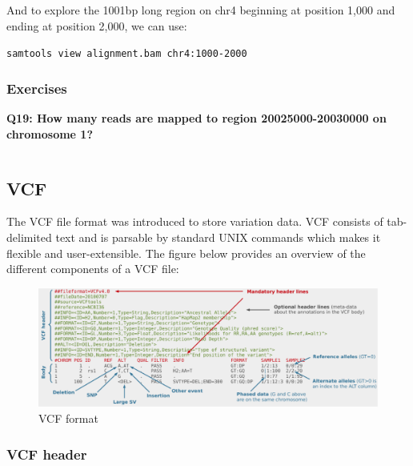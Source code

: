 \documentclass[11pt]{article}
\makeatletter
\newcommand{\boxspacing}{\kern\kvtcb@left@rule\kern\kvtcb@boxsep}
\newcommand{\prompt}[4]{
        {\ttfamily\llap{{\color{#2}[#3]:\hspace{3pt}#4}}\vspace{-\baselineskip}}
    }
\makeatother
\begin{document}
    And to explore the 1001bp long region on chr4 beginning at position
1,000 and ending at position 2,000, we can use:

    \texttt{samtools\ view\ alignment.bam\ chr4:1000-2000}

    \hypertarget{exercises}{%
\subsubsection{Exercises}\label{exercises}}

\textbf{Q19: How many reads are mapped to region 20025000-20030000 on
chromosome 1?}

    \begin{tcolorbox}[breakable, size=fbox, boxrule=1pt, pad at break*=1mm,colback=cellbackground, colframe=cellborder]
\prompt{In}{incolor}{ }{\boxspacing}
\begin{Verbatim}[commandchars=\\\{\}]

\end{Verbatim}
\end{tcolorbox}

    \hypertarget{vcf}{%
\subsection{VCF}\label{vcf}}

The VCF file format was introduced to store variation data. VCF consists
of tab-delimited text and is parsable by standard UNIX commands which
makes it flexible and user-extensible. The figure below provides an
overview of the different components of a VCF file:

    \begin{figure}
\centering
\includegraphics{img/VCF1.png}
\caption{VCF format}
\end{figure}

    \hypertarget{vcf-header}{%
\subsubsection{VCF header}\label{vcf-header}}
\end{document}
